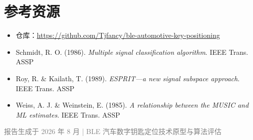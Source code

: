 \documentclass[11pt,a4paper]{article}
\begin{document}
\newpage
\section*{参考资源}
\begin{itemize}
    \item 仓库：\url{https://github.com/Tjfancy/ble-automotive-key-positioning}
    \item Schmidt, R. O. (1986). \emph{Multiple signal classification algorithm}. IEEE Trans. ASSP
    \item Roy, R. \& Kailath, T. (1989). \emph{ESPRIT---a new signal subspace approach}. IEEE Trans. ASSP
    \item Weiss, A. J. \& Weinstein, E. (1985). \emph{A relationship between the MUSIC and ML estimates}. IEEE Trans. ASSP
\end{itemize}

\vfill
\begin{center}
\small \textcolor{gray}{报告生成于 2026 年 8 月 | BLE 汽车数字钥匙定位技术原型与算法评估}
\end{center}
\end{document}
